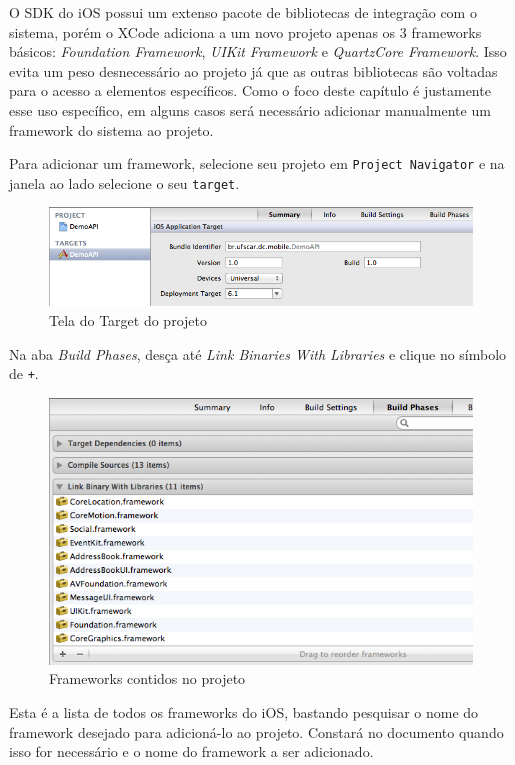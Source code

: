 \documentclass[a4paper,12pt,brazil,doubleside]{book}
\begin{document}
\begin{singlespace}
O SDK do iOS possui um extenso pacote de bibliotecas de integração com o sistema, porém o XCode adiciona a um novo projeto apenas os 3 frameworks básicos: \emph{Foundation Framework}, \emph{UIKit Framework} e \emph{QuartzCore Framework}. Isso evita um peso desnecessário ao projeto já que as outras bibliotecas são voltadas para o acesso a elementos específicos. Como o foco deste capítulo é justamente esse uso específico, em alguns casos será necessário adicionar manualmente um framework do sistema ao projeto.

Para adicionar um framework, selecione seu projeto em \texttt{Project Navigator} e na janela ao lado selecione o seu \texttt{target}.

\bigskip
\bigskip

\begin{figure}[H]
  \centering
  \includegraphics[width=.75\textwidth]{figuras/framework1.png}
  \caption{Tela do Target do projeto}
  \label{fig:a}
\end{figure}

\bigskip


Na aba \emph{Build Phases}, desça até \emph{Link Binaries With Libraries} e clique no símbolo de \texttt{+}.

\bigskip
\bigskip

\begin{figure}[H]
  \centering
  \includegraphics[width=.75\textwidth]{figuras/framework2.png}
  \caption{Frameworks contidos no projeto}
  \label{fig:a}
\end{figure}

\bigskip


Esta é a lista de todos os frameworks do iOS, bastando pesquisar o nome do framework desejado para adicioná-lo ao projeto. Constará no documento quando isso for necessário e o nome do framework a ser adicionado.


\end{singlespace}
\end{document}
